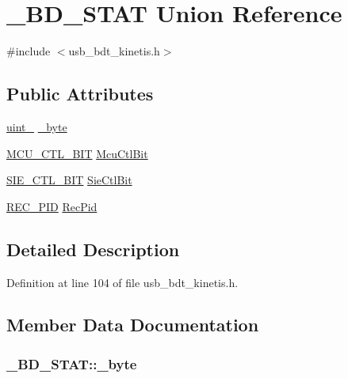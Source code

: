 \hypertarget{union___b_d___s_t_a_t}{}\section{\+\_\+\+B\+D\+\_\+\+S\+T\+AT Union Reference}
\label{union___b_d___s_t_a_t}


{\ttfamily \#include $<$usb\+\_\+bdt\+\_\+kinetis.\+h$>$}

\subsection*{Public Attributes}
\begin{DoxyCompactItemize}
\item 
\hyperlink{types_8h_ad3209046c23f739a81581c10a4be7d92}{uint\+\_} \hyperlink{union___b_d___s_t_a_t_aa90e7cacfe9f4a4ce7795fdd579375ef}{\+\_\+byte}
\item 
\hyperlink{usb__bdt__kinetis_8h_a9a07dbd18c0095a8f66be20205bc18ee}{M\+C\+U\+\_\+\+C\+T\+L\+\_\+\+B\+IT} \hyperlink{union___b_d___s_t_a_t_a6f3454ad380bb97ebc18bff0aebd7dbf}{Mcu\+Ctl\+Bit}
\item 
\hyperlink{usb__bdt__kinetis_8h_a0a585950a8421d261cee60acf79f4245}{S\+I\+E\+\_\+\+C\+T\+L\+\_\+\+B\+IT} \hyperlink{union___b_d___s_t_a_t_adbf25cf7fb5a7928b7b73ab29e5c1816}{Sie\+Ctl\+Bit}
\item 
\hyperlink{usb__bdt__kinetis_8h_a684ee65d2b71d456a804a10c9d89b2e3}{R\+E\+C\+\_\+\+P\+ID} \hyperlink{union___b_d___s_t_a_t_a1e2426c2abc396ce01a4b4c3ab50e39b}{Rec\+Pid}
\end{DoxyCompactItemize}


\subsection{Detailed Description}


Definition at line 104 of file usb\+\_\+bdt\+\_\+kinetis.\+h.



\subsection{Member Data Documentation}
\subsubsection[{\texorpdfstring{\+\_\+byte}{_byte}}]{ \+\_\+\+B\+D\+\_\+\+S\+T\+A\+T\+::\+\_\+byte}\hypertarget{union___b_d___s_t_a_t_aa90e7cacfe9f4a4ce7795fdd579375ef}{}\label{union___b_d___s_t_a_t_aa90e7cacfe9f4a4ce7795fdd579375ef}


